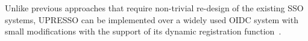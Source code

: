 Unlike previous approaches that require non-trivial re-design of the existing SSO systems, UPRESSO can be implemented over a widely used OIDC system with small modifications with the support of its dynamic registration function~\cite{DynamicRegistration}.




